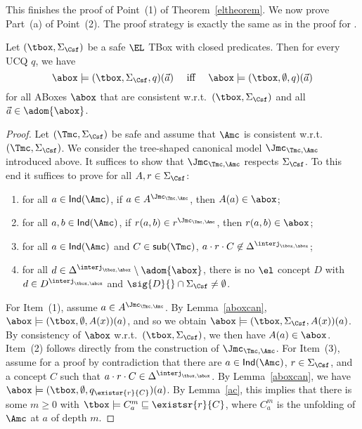 \documentclass{lmcs}
\theoremstyle{definition}
\begin{document}
This finishes the proof of Point~(1) of Theorem~\ref{eltheorem}. We now prove Part~(a) of Point~(2). 
The proof strategy is exactly the same as in the proof for \dlliter.

\begin{lem}\label{lem:point2parta} Let $(\tbox,\Sigma_\Csf)$ be a safe $\EL$ TBox with closed 
  predicates. Then for every UCQ $q$, we have 
  \[\abox\models 
  (\tbox,\Sigma_\Csf,q)(\vec{a})\quad \text{ iff 
  }  \quad
  \abox\models(\tbox,\emptyset,q)(\vec{a})\]
  for all ABoxes $\abox$ that are consistent w.r.t.\ $(\tbox,\Sigma_\Csf)$ and all $\vec{a}\in\adom{\abox}$.
\end{lem}
\begin{proof}
  Let $(\Tmc,\Sigma_\Csf)$ be safe and assume that $\Amc$ is consistent
  w.r.t.~$(\Tmc,\Sigma_\Csf)$.
  We consider the tree-shaped canonical model $\Jmc_{\Tmc,\Amc}$ introduced above. It suffices to show that
  $\Jmc_{\Tmc,\Amc}$ respects $\Sigma_{\Csf}$. To this end it suffices to prove for all $A,r\in \Sigma_{\Csf}$:
\begin{enumerate}
\item for all $a\in {\sf Ind}(\Amc)$, if $a\in A^{\Jmc_{\Tmc,\Amc}}$, then $A(a)\in\abox$; 
\item for all $a,b\in {\sf Ind}(\Amc)$, if $r(a,b)\in r^{\Jmc_{\Tmc,\Amc}}$, then $r(a,b)\in\abox$;
\item for all $a\in {\sf Ind}(\Amc)$ and $C\in {\sf sub}(\Tmc)$, $a\cdot r\cdot C\not\in\Delta^{\interj_{\tbox,\abox}}$;
\item for all $d\in\Delta^{\interj_{\tbox,\abox}}\setminus\adom{\abox}$, 
    there is no $\el$ concept $D$ with $d\in D^{\interj_{\tbox,\abox}}$ 
    and $\sig{D}{}\cap\Sigma_\Csf\neq\emptyset$.
\end{enumerate}
For Item~(1), assume $a\in A^{\Jmc_{\Tmc,\Amc}}$. By Lemma~\ref{aboxcan}, $\abox\models (\tbox,\emptyset,A(x))(a)$,
and so we obtain $\abox\models (\tbox,\Sigma_\Csf,A(x))(a)$. By consistency of $\abox$ w.r.t.\ $(\tbox,\Sigma_\Csf)$, 
we then have $A(a)\in\abox$. Item~(2) follows directly from the construction of $\Jmc_{\Tmc,\Amc}$.
For Item~(3), assume for a proof by contradiction that there are $a\in {\sf Ind}(\Amc)$, $r\in \Sigma_{\Csf}$, and a concept $C$
such that $a\cdot r\cdot C\in\Delta^{\interj_{\tbox,\abox}}$. By Lemma~\ref{aboxcan}, we have $\abox\models
    (\tbox,\emptyset,q_{\existsr{r}{C}})(a)$. By Lemma~\ref{ac}, this implies
    that there is some $m\geq 0$ with $\tbox\models
    C_a^m\sqsubseteq\existsr{r}{C}$, where $C_{a}^{m}$ is the unfolding of $\Amc$ at $a$ of depth $m$.

\end{proof}
\end{document}

